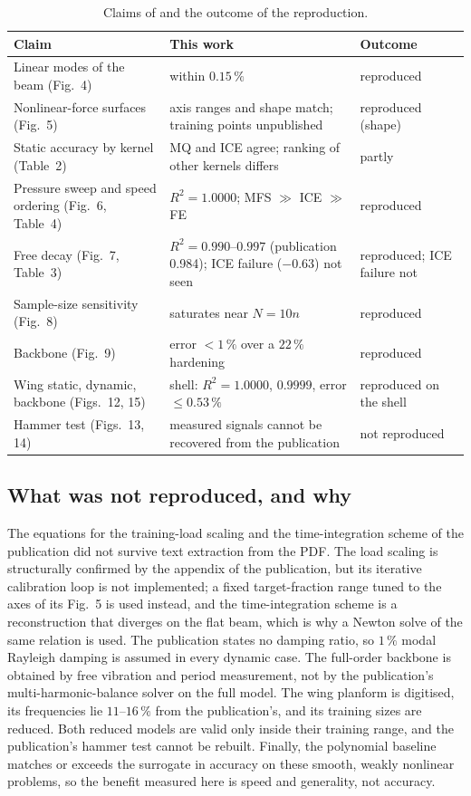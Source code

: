 \begin{table}[tbp]
\centering\footnotesize
\caption{Claims of \citet{he2023mfsnlrom} and the outcome of the reproduction.}\label{tab:vf-mfs-cmp}
\begin{tabularx}{\linewidth}{@{}>{\raggedright\arraybackslash}p{4.1cm} >{\raggedright\arraybackslash}X >{\raggedright\arraybackslash}p{2.3cm}@{}}
\toprule
Claim & This work & Outcome\\
\midrule
Linear modes of the beam (Fig.~4) & within $0.15\,\%$ & reproduced\\
Nonlinear-force surfaces (Fig.~5) & axis ranges and shape match; training points unpublished & reproduced (shape)\\
Static accuracy by kernel (Table~2) & MQ and ICE agree; ranking of other kernels differs & partly\\
Pressure sweep and speed ordering (Fig.~6, Table~4) & $R^2=1.0000$; MFS $\gg$ ICE $\gg$ FE & reproduced\\
Free decay (Fig.~7, Table~3) & $R^2=0.990$--$0.997$ (publication 0.984); ICE failure ($-0.63$) not seen & reproduced; ICE failure not\\
Sample-size sensitivity (Fig.~8) & saturates near $N=10n$ & reproduced\\
Backbone (Fig.~9) & error $<1\,\%$ over a $22\,\%$ hardening & reproduced\\
Wing static, dynamic, backbone (Figs.~12, 15) & shell: $R^2=1.0000$, $0.9999$, error $\le0.53\,\%$ & reproduced on the shell\\
Hammer test (Figs.~13, 14) & measured signals cannot be recovered from the publication & not reproduced\\
\bottomrule
\end{tabularx}
\end{table}

\subsection*{What was not reproduced, and why}

The equations for the training-load scaling and the time-integration scheme of the publication did not survive text extraction from the PDF. The load scaling is structurally confirmed by the appendix of the publication, but its iterative calibration loop is not implemented; a fixed target-fraction range tuned to the axes of its Fig.~5 is used instead, and the time-integration scheme is a reconstruction that diverges on the flat beam, which is why a Newton solve of the same relation is used. The publication states no damping ratio, so $1\,\%$ modal Rayleigh damping is assumed in every dynamic case. The full-order backbone is obtained by free vibration and period measurement, not by the publication's multi-harmonic-balance solver on the full model. The wing planform is digitised, its frequencies lie $11$--$16\,\%$ from the publication's, and its training sizes are reduced. Both reduced models are valid only inside their training range, and the publication's hammer test cannot be rebuilt. Finally, the polynomial baseline matches or exceeds the surrogate in accuracy on these smooth, weakly nonlinear problems, so the benefit measured here is speed and generality, not accuracy.

